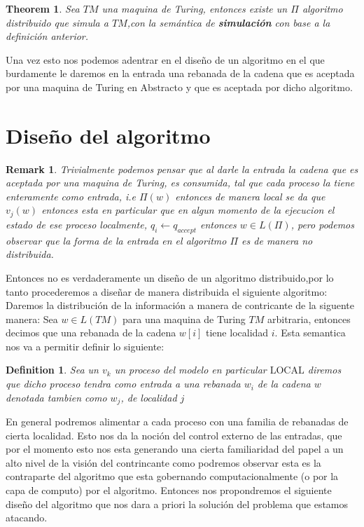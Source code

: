 \documentclass[10pt]{report}
\newtheorem*{remark}{Remark}
\newtheorem{definition}{Definition}
\newtheorem{theorem}{Theorem}
\begin{document}
    \begin{theorem}
        Sea $TM$ una maquina de Turing, entonces existe un $\Pi$ algoritmo distribuido que simula
        a $TM$,con la semántica de \textbf{simulación} con base a la definición anterior.
    \end{theorem}
    Una vez esto nos podemos adentrar en el diseño de un algoritmo en el que burdamente le daremos en la entrada una
    rebanada de la cadena que es aceptada por una maquina de Turing en Abstracto y que es aceptada por dicho algoritmo.

    \section{Diseño del algoritmo}\label{sec:diseño-del-algoritmo}
    \begin{remark}
        Trivialmente podemos pensar que al darle la entrada la cadena que es aceptada por una maquina de Turing,
        es consumida, tal que cada proceso la tiene enteramente como entrada, i.e $\Pi(w)$ entonces de manera local se da
        que $v_{j}(w)$ entonces esta en particular que en algun momento de la ejecucion el estado de ese proceso localmente,
        $q_{i}\gets q_{accept}$ entonces $w\in L(\Pi)$, pero podemos observar que la forma de la entrada en el algoritmo $\Pi$
        es de manera no distribuida.
    \end{remark}
    Entonces no es verdaderamente un diseño de un algoritmo distribuido,por lo tanto procederemos a diseñar de manera
    distribuida el siguiente algoritmo:
    \space
    Daremos la distribución de la información a manera de contricante de la siguente manera:
    Sea $w\in L(TM)$ para una maquina de Turing $TM$ arbitraria, entonces decimos que una rebanada de la cadena
    $w[i]$ tiene localidad $i$.
    Esta semantica nos va a permitir definir lo siguiente:
    \theoremstyle{definition}
    \begin{definition}
        Sea un $v_{k}$ un proceso del modelo en particular $\text{LOCAL}$ diremos que dicho proceso
        tendra como entrada a una rebanada $w_{i}$ de la cadena $w$ denotada tambien como
        $w_{j}$, de localidad $j$
    \end{definition}
    En general podremos alimentar a cada proceso con una familia de rebanadas de cierta localidad.
    Esto nos da la noción del control externo de las entradas, que por el momento esto nos esta generando
    una cierta familiaridad del papel a un alto nivel de la visión del contrincante como podremos observar
    esta es la contraparte del algoritmo que esta gobernando computacionalmente (o por la capa de computo)
    por el algoritmo.
    \space
    Entonces nos propondremos el siguiente diseño del algoritmo que nos dara a priori
    la solución del problema que estamos atacando.
\end{document}
